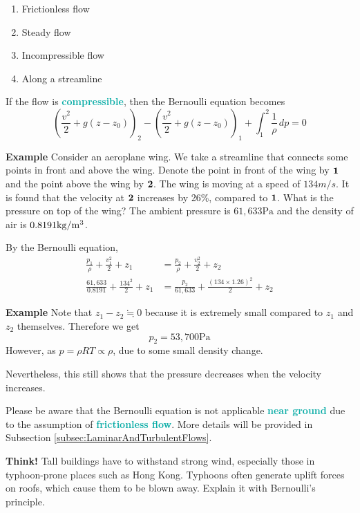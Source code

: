 \documentclass[twoside]{article}
\newcommand{\question}[1]{\begin{questionbox} \emoji{grapes} \textbf{Think!} \newline #1 \end{questionbox}}
\newcommand{\example}[1]{\begin{examplebox} \emoji{croissant} \textbf{Example} \newline #1 \end{examplebox}}
\newcommand{\highlightbluetext}[1]{\textcolor[HTML]{09ACA6}{\textbf{#1}}}
\numberwithin{equation}{section}
\begin{document}
	\begin{enumerate}
		\item Frictionless flow
		\item Steady flow
		\item Incompressible flow
		\item Along a streamline
	\end{enumerate}
	If the flow is \highlightbluetext{compressible}, then the Bernoulli equation becomes
	\begin{equation}
		\left( \frac{v^2}{2}+g(z-z_0) \right)_2-\left( \frac{v^2}{2}+g(z-z_0) \right)_1+\int_1^2 \frac{1}{\rho} \, dp = 0
		\label{eq:BernoulliEquationCompressible}
	\end{equation}
	
	\example{
		Consider an aeroplane wing. We take a streamline that connects some points in front and above the wing. Denote the point in front of the wing by $\bf{1}$ and the point above the wing by $\bf{2}$. The wing is moving at a speed of $134 \unit{m/s}$. It is found that the velocity at $\bf{2}$ increases by 26\%, compared to $\bf{1}$. What is the pressure on top of the wing? The ambient pressure is $61,633 \unit{\pascal}$ and the density of air is $0.8191 \unit{kg/m\cubed}$.
		
		By the Bernoulli equation,
		\begin{align*}
			\frac{p_1}{\rho}+\frac{v_1^2}{2}+z_1 &= \frac{p_2}{\rho}+\frac{v_2^2}{2}+z_2 \\
			\frac{61,633}{0.8191}+\frac{134^2}{2}+z_1 &= \frac{p_2}{61,633}+\frac{(134 \times 1.26)^2}{2}+z_2
		\end{align*}
	}
	
	\example{
		Note that $z_1-z_2 \fallingdotseq 0$ because it is extremely small compared to $z_1$ and $z_2$ themselves. Therefore we get
		\begin{equation*}
			p_2 = 53,700 \unit{\pascal}
		\end{equation*}
		However, as $p = \rho RT \propto \rho$, due to some small density change.
		
		Nevertheless, this still shows that the pressure decreases when the velocity increases.
	}
	
	Please be aware that the Bernoulli equation is not applicable \highlightbluetext{near ground} due to the assumption of \highlightbluetext{frictionless flow}. More details will be provided in Subsection \ref{subsec:LaminarAndTurbulentFlows}.
	
	\question{
		Tall buildings have to withstand strong wind, especially those in typhoon-prone places such as Hong Kong. Typhoons often generate uplift forces on roofs, which cause them to be blown away. Explain it with Bernoulli's principle.
	}
	
\end{document}
